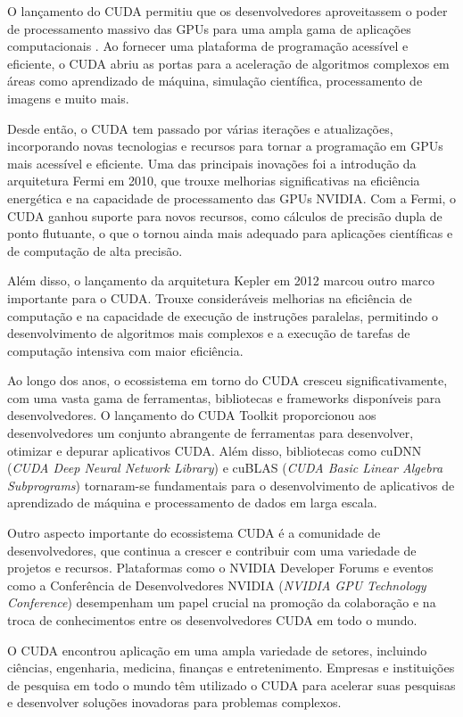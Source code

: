 \documentclass[12pt,
openright, 
oneside, %
a4paper,    %
brazil]{facom-ufu-abntex2}
\begin{document}
O lançamento do CUDA permitiu que os desenvolvedores aproveitassem o poder de processamento massivo das GPUs para uma ampla gama de aplicações computacionais \cite{cudaByExampleSanders2010}. Ao fornecer uma plataforma de programação acessível e eficiente, o CUDA abriu as portas para a aceleração de algoritmos complexos em áreas como aprendizado de máquina, simulação científica, processamento de imagens e muito mais.

Desde então, o CUDA tem passado por várias iterações e atualizações, incorporando novas tecnologias e recursos para tornar a programação em GPUs mais acessível e eficiente. Uma das principais inovações foi a introdução da arquitetura Fermi em 2010, que trouxe melhorias significativas na eficiência energética e na capacidade de processamento das GPUs NVIDIA. Com a Fermi, o CUDA ganhou suporte para novos recursos, como cálculos de precisão dupla de ponto flutuante, o que o tornou ainda mais adequado para aplicações científicas e de computação de alta precisão.

Além disso, o lançamento da arquitetura Kepler em 2012 marcou outro marco importante para o CUDA. Trouxe consideráveis melhorias na eficiência de computação e na capacidade de execução de instruções paralelas, permitindo o desenvolvimento de algoritmos mais complexos e a execução de tarefas de computação intensiva com maior eficiência.

Ao longo dos anos, o ecossistema em torno do CUDA cresceu significativamente, com uma vasta gama de ferramentas, bibliotecas e frameworks disponíveis para desenvolvedores. O lançamento do CUDA Toolkit proporcionou aos desenvolvedores um conjunto abrangente de ferramentas para desenvolver, otimizar e depurar aplicativos CUDA. Além disso, bibliotecas como cuDNN (\textit{CUDA Deep Neural Network Library}) e cuBLAS (\textit{CUDA Basic Linear Algebra Subprograms}) tornaram-se fundamentais para o desenvolvimento de aplicativos de aprendizado de máquina e processamento de dados em larga escala.

Outro aspecto importante do ecossistema CUDA é a comunidade de desenvolvedores, que continua a crescer e contribuir com uma variedade de projetos e recursos. Plataformas como o NVIDIA Developer Forums e eventos como a Conferência de Desenvolvedores NVIDIA (\textit{NVIDIA GPU Technology Conference}) desempenham um papel crucial na promoção da colaboração e na troca de conhecimentos entre os desenvolvedores CUDA em todo o mundo.

O CUDA encontrou aplicação em uma ampla variedade de setores, incluindo ciências, engenharia, medicina, finanças e entretenimento. Empresas e instituições de pesquisa em todo o mundo têm utilizado o CUDA para acelerar suas pesquisas e desenvolver soluções inovadoras para problemas complexos.
\end{document}
